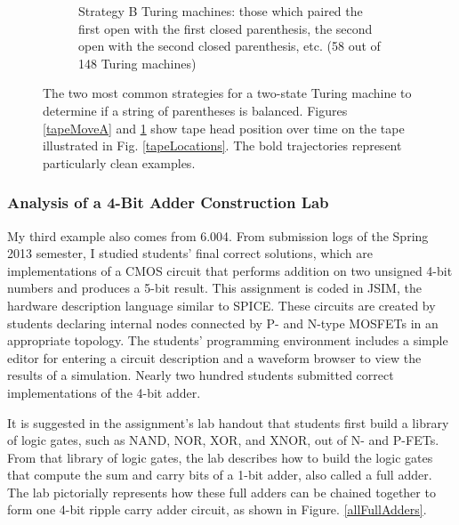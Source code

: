 \documentclass[12pt]{article}
\begin{document}
\begin{figure}[p]
\begin{subfigure}[b]{1.0\textwidth}
\caption{Strategy B Turing machines: those which paired the first open with the first closed parenthesis, the second open with the second closed parenthesis, etc. (58 out of 148 Turing machines)}
\label{tapeMoveB}
\end{subfigure}
\caption{The two most common strategies for a two-state Turing machine to determine if a string of parentheses is balanced. Figures \ref{tapeMoveA} and \ref{tapeMoveB} show tape head position over time on the tape illustrated in Fig. \ref{tapeLocations}. The bold trajectories represent particularly clean examples.}
\label{turingFig}
\end{figure}

\subsubsection{Analysis of a 4-Bit Adder Construction Lab}

My third example also comes from 6.004. From submission logs of the Spring 2013 semester, I studied students' final correct solutions, which are implementations of a CMOS circuit that performs addition on two unsigned 4-bit numbers and produces a 5-bit result. This assignment is coded in JSIM, the hardware description language similar to SPICE. These circuits are created by students declaring internal nodes connected by P- and N-type MOSFETs in an appropriate topology. The students' programming environment includes a simple editor for entering a circuit description and a waveform browser to view the results of a simulation. Nearly two hundred students submitted correct implementations of the 4-bit adder. 

It is suggested in the assignment's lab handout that students first build a library of logic gates, such as NAND, NOR, XOR, and XNOR, out of N- and P-FETs. From that library of logic gates, the lab describes how to build the logic gates that compute the sum and carry bits of a 1-bit adder, also called a full adder. The lab pictorially represents how these full adders can be chained together to form one 4-bit ripple carry adder circuit, as shown in Figure. \ref{allFullAdders}.
\end{document}
